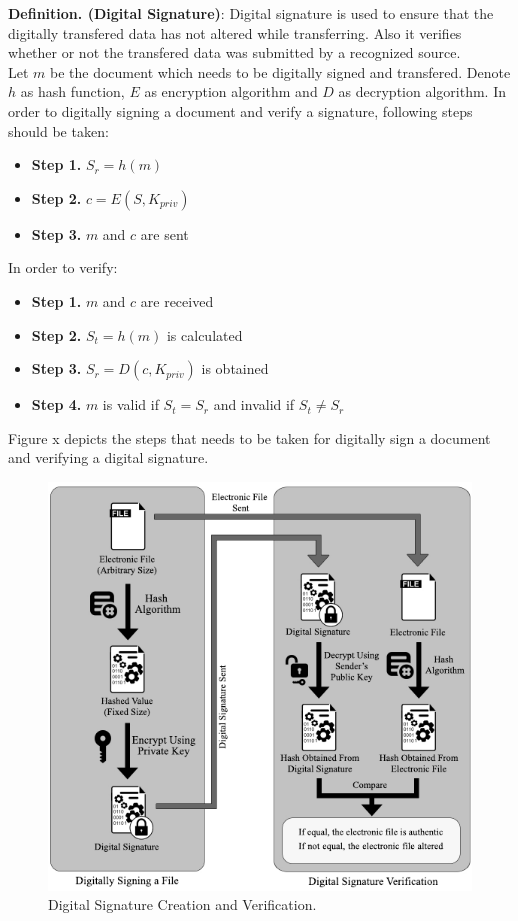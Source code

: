 \textbf{Definition. (Digital Signature)}: Digital signature is used to ensure that the digitally transfered data has not altered while transferring. Also it verifies whether or not the transfered data was submitted by a recognized source. \\
Let $m$ be the document which needs to be digitally signed and transfered. Denote $h$ as hash function, $E$ as encryption algorithm and $D$ as decryption algorithm. In order to digitally signing a document and verify a signature, following steps should be taken:
\begin{itemize}
	\item \textbf{Step 1.} $S_r = h(m)$
	\item \textbf{Step 2.} $c = E(S,K_{priv})$
	\item \textbf{Step 3.} $m$ and $c$ are sent
\end{itemize}
In order to verify:
\begin{itemize}
	\item \textbf{Step 1.} $m$ and $c$ are received
	\item \textbf{Step 2.} $S_t = h(m)$ is calculated
	\item \textbf{Step 3.} $S_r = D(c,K_{priv})$ is obtained
	\item \textbf{Step 4.} $m$ is valid if $S_t = S_r$ and invalid if $S_t \neq S_r$
\end{itemize}
Figure x depicts the steps that needs to be taken for digitally sign a document and verifying a digital signature.
\begin{figure}
	\label{fig:DigitalSignature}
	\centering
	\includegraphics[width=\textwidth]{figs/digital_signature.pdf}
	\caption{Digital Signature Creation and Verification.}
\end{figure}
